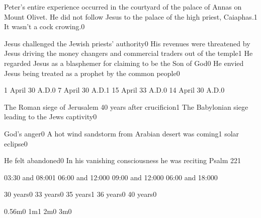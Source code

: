 {Peter's entire experience occurred in the courtyard of the palace of Annas on Mount Olivet. He did not follow Jesus to the palace of the high priest, Caiaphas.}{1}
{It wasn't a cock crowing.}{0}
\qstop

{Jesus challenged the Jewish priests' authority}{0}
{His revenues were threatened by Jesus driving the money changers and commercial traders out of the temple}{1}
{He regarded Jesus as a blasphemer for claiming to be the Son of God}{0}
{He envied Jesus being treated as a prophet by the common people}{0}
\qstop


{1 April 30 A.D.}{0}
{7 April 30 A.D.}{1}
{15 April 33 A.D.}{0}
{14 April 30 A.D.}{0}
\qstop



{The Roman siege of Jerusalem 40 years after crucificion}{1}
{The Babylonian siege leading to the Jews captivity}{0}
\qstop

{God's anger}{0}
{A hot wind sandstorm from Arabian desert was coming}{1}
{solar eclipse}{0}
\qstop

{He felt abandoned}{0}
{In his vanishing consciousness he was reciting Psalm 22}{1}
\qstop

{03:30 and 08:00}{1}
{06:00 and 12:00}{0}
{09:00 and 12:00}{0}
{06:00 and 18:00}{0}
\qstop

{30 years}{0}
{33 years}{0}
{35 years}{1}
{36 years}{0}
{40 years}{0}
\qstop

{0.56m}{0}
{1m}{1}
{2m}{0}
{3m}{0}
\qstop

